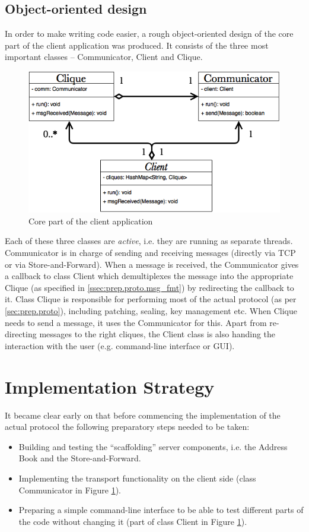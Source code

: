 \documentclass[a4paper, 12pt]{report}
\begin{document}
\subsection{Object-oriented design}
In order to make writing code easier, a rough object-oriented design of the core part of the client application was produced. It consists of the three most important classes -- Communicator, Client and Clique.

\begin{figure}[H]
    \centering
    \includegraphics[width = 0.7 \linewidth]{pics/core_uml.png}
    \caption{\label{fig:core_uml} Core part of the client application}
\end{figure}

Each of these three classes are \emph{active}, i.e. they are running as separate threads. Communicator is in charge of sending and receiving messages (directly via TCP or via Store-and-Forward). When a message is received, the Communicator gives a callback to class Client which demultiplexes the message into the appropriate Clique (as specified in \cref{ssec:prep.proto.msg_fmt}) by redirecting the callback to it. Class Clique is responsible for performing most of the actual protocol (as per \cref{sec:prep.proto}), including patching, sealing, key management etc. When Clique needs to send a message, it uses the Communicator for this. Apart from re-directing messages to the right cliques, the Client class is also handing the interaction with the user (e.g. command-line interface or GUI).

\section{Implementation Strategy}
\label{sec:prep.impl_strat}
It became clear early on that before commencing the implementation of the actual protocol the following preparatory steps needed to be taken:
\begin{itemize}
    \item Building and testing the ``scaffolding'' server components, i.e. the Address Book and the Store-and-Forward.
    \item Implementing the transport functionality on the client side (class Communicator in Figure \ref{fig:core_uml}).
    \item Preparing a simple command-line interface to be able to test different parts of the code without changing it (part of class Client in Figure \ref{fig:core_uml}).
\end{itemize}
\end{document}

